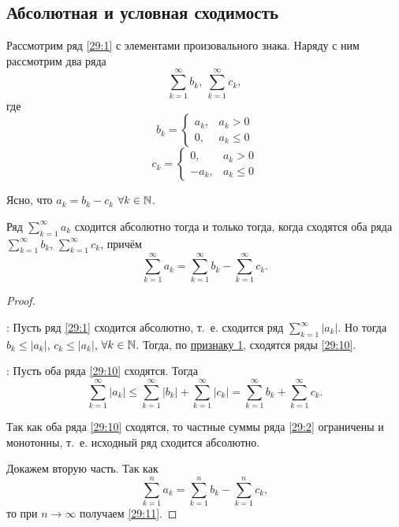 \documentclass[../../main.tex]{subfiles}
\begin{document}
	\subsection{Абсолютная и условная сходимость}
	
	Рассмотрим ряд \eqref{29:1} с элементами произовального знака. Наряду с ним рассмотрим два ряда 
	\begin{equation}
		\sum\limits_{k = 1}^\infty b_k,\ \sum\limits_{k = 1}^\infty c_k,
		\label{29:10}
	\end{equation} 
	где
	\[b_k = \begin{cases}
		a_k,& a_{k} > 0\\
		0,& a_{k}\leq0
	\end{cases}\]
	\[c_k = \begin{cases}
		0,& a_{k} > 0\\
		-a_k,& a_{k}\leq 0
	\end{cases}\]
	
	Ясно, что $a_k = b_k - c_k$ $\forall k\in\mathbb{N}$.
	
	\begin{thm}\label{29:absolute_conv}
		Ряд $\sum\limits_{k = 1}^\infty a_k$ сходится абсолютно 
		тогда и только тогда, когда сходятся оба ряда 
		$\sum\limits_{k = 1}^\infty b_k$, $\sum\limits_{k = 1}^\infty c_k$, 
		причём
		\begin{equation}
			\sum_{k = 1}^\infty a_k = \sum_{k = 1}^\infty b_k - \sum_{k = 1}^\infty c_k.
			\label{29:11}
		\end{equation}
	\end{thm}
	\begin{proof}
		~
		
		\nec: Пусть ряд \eqref{29:1} сходится 
		абсолютно, т.~е. сходится ряд $\sum\limits_{k = 1}^\infty |a_k|$.
		Но тогда $b_k\leq |a_k|$, $c_k\leq |a_k|$, $\forall k\in\mathbb{N}$. 
		Тогда, по \hyperref[lec26:comp_test_1]{признаку 1\textdegree}, 
		сходятся ряды \eqref{29:10}.
		
		\suff: Пусть оба ряда \eqref{29:10} сходятся. 
		Тогда
		\[\sum_{k = 1}^\infty |a_k|\leq \sum_{k = 1}^\infty |b_k| + 
		\sum_{k = 1}^\infty|c_k| = \sum_{k = 1}^\infty b_k + 
		\sum_{k = 1}^\infty c_k.\]
		
		Так как оба ряда \eqref{29:10} сходятся, 
		то частные суммы ряда \eqref{29:2} ограничены и монотонны, т.~е. исходный ряд сходится абсолютно.
		
		Докажем вторую часть. Так как 
		\[\sum_{k = 1}^n a_k = \sum_{k = 1}^n b_k - \sum_{k = 1}^n c_k,\]
		то при $n\to\infty$ получаем \eqref{29:11}.
	\end{proof}
\end{document}
